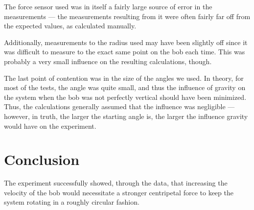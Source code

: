 The force sensor used was in itself a fairly large source of error in the measurements --- the measurements resulting from it were often fairly far off from the expected values, as calculated manually.

Additionally, measurements to the radius used may have been slightly off since it was difficult to measure to the exact same point on the bob each time.
This was probably a very small influence on the resulting calculations, though.

The last point of contention was in the size of the angles we used.
In theory, for most of the tests, the angle was quite small, and thus the influence of gravity on the system when the bob was not perfectly vertical should have been minimized.
Thus, the calculations generally assumed that the influence was negligible --- however, in truth, the larger the starting angle is, the larger the influence gravity would have on the experiment.

\section{Conclusion}

The experiment successfully showed, through the data, that increasing the velocity of the bob would necessitate a stronger centripetal force to keep the system rotating in a roughly circular fashion.

